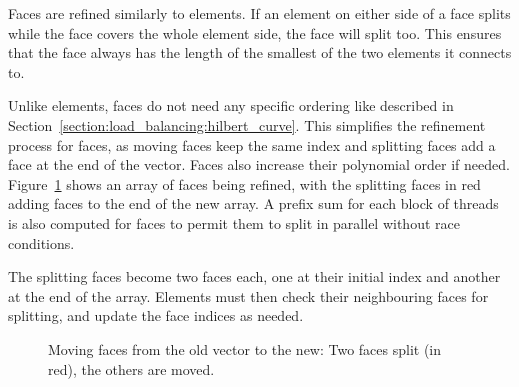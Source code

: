 Faces are refined similarly to elements. If an element on either side of a face splits while the
face covers the whole element side, the face will split too. This ensures that the face always has
the length of the smallest of the two elements it connects to. 

Unlike elements, faces do not need any specific ordering like described in
Section~\ref{section:load_balancing:hilbert_curve}. This simplifies the refinement process for
faces, as moving faces keep the same index and splitting faces add a face at the end of the vector.
Faces also increase their polynomial order if needed. Figure~\ref{fig:refinement_offset_face} shows
an array of faces being refined, with the splitting faces in red adding faces to the end of the new
array. A prefix sum for each block of threads is also computed for faces to permit them to split in
parallel without race conditions.

The splitting faces become two faces each, one at their initial index and another at the end of the
array. Elements must then check their neighbouring faces for splitting, and update the face indices
as needed.

\begin{figure}[H]
	\centering
	
	\caption{Moving faces from the old vector to the new: Two faces split (in red), the others are moved.}\label{fig:refinement_offset_face}
\end{figure}
